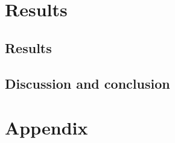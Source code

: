 \part{Results}\label{pt:test}
\chapter{Results}
\graphicspath{{figures/tests/}}
%
\chapter{Discussion and conclusion}
%



 




\glsresetall
\appendix %

 \graphicspath{{figures/appendix/}}
\part{Appendix}\label{pt:appendix}
%




